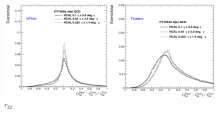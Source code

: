 \begin{figure}
	\centering
	\includegraphics[width=\textwidth]{./Figures/hcal_gran_tau32.png}
	\caption{$\tau_{32}$}
	\label{fig:hcal_gran_tau32}
\end{figure}
%
%

